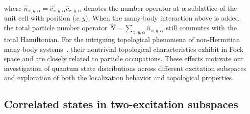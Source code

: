 \documentclass[longbibliography, aps, prx, amsmath, amssymb, amsfonts, twocolumn,superscriptaddress, footinbib]{revtex4-1}
\begin{document}
	where $\hat{n}_{{x},{y},\alpha}=\hat{c}_{x,y,\alpha}^{\dagger}\hat{c}_{x,y,\alpha}$ denotes the number operator at $\alpha$ sublattice of the unit cell with position (${x},{y}$). When the many-body interaction above is added, the
	total particle number operator $\hat{N} = \sum_{x,y,\alpha} \hat{n}_{x,y,\alpha}$ still commutes with the total Hamiltonian.
    For the intriguing topological phenomena of non-Hermitian many-body systems~\cite{shen2024enhanced,shimomura2024general,deng2022observing}, their nontrivial topological characteristics exhibit in Fock space and are closely related to particle occupations. These effects motivate our investigation of quantum state distributions across different excitation subspaces and exploration of both the localization behavior and topological properties.

	\subsection{Correlated states in two-excitation subspaces}
\end{document}
